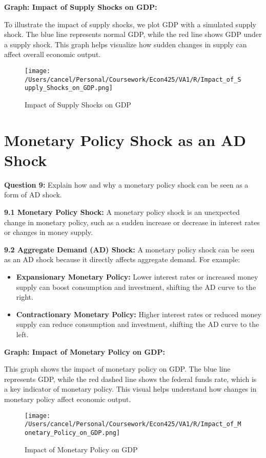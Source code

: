 \documentclass{article}
\begin{document}
\textbf{Graph: Impact of Supply Shocks on GDP:} 

To illustrate the impact of supply shocks, we plot GDP with a simulated supply shock. The blue line represents normal GDP, while the red line shows GDP under a supply shock. This graph helps visualize how sudden changes in supply can affect overall economic output.

\begin{figure}[h!]
    \centering
    \texttt{[image: /Users/cancel/Personal/Coursework/Econ425/VA1/R/Impact\_of\_Supply\_Shocks\_on\_GDP.png]}
    \caption{Impact of Supply Shocks on GDP}
\end{figure}

\hrulefill

\section{Monetary Policy Shock as an AD Shock}

\textbf{Question 9:} Explain how and why a monetary policy shock can be seen as a form of AD shock.

\textbf{9.1 Monetary Policy Shock:} A monetary policy shock is an unexpected change in monetary policy, such as a sudden increase or decrease in interest rates or changes in money supply.

\textbf{9.2 Aggregate Demand (AD) Shock:} A monetary policy shock can be seen as an AD shock because it directly affects aggregate demand. For example:

\begin{itemize}
    \item \textbf{Expansionary Monetary Policy:} Lower interest rates or increased money supply can boost consumption and investment, shifting the AD curve to the right.
    \item \textbf{Contractionary Monetary Policy:} Higher interest rates or reduced money supply can reduce consumption and investment, shifting the AD curve to the left.
\end{itemize}

\textbf{Graph: Impact of Monetary Policy on GDP:} 

This graph shows the impact of monetary policy on GDP. The blue line represents GDP, while the red dashed line shows the federal funds rate, which is a key indicator of monetary policy. This visual helps understand how changes in monetary policy affect economic output.

\begin{figure}[h!]
    \centering
    \texttt{[image: /Users/cancel/Personal/Coursework/Econ425/VA1/R/Impact\_of\_Monetary\_Policy\_on\_GDP.png]}
    \caption{Impact of Monetary Policy on GDP}
\end{figure}
\end{document}
